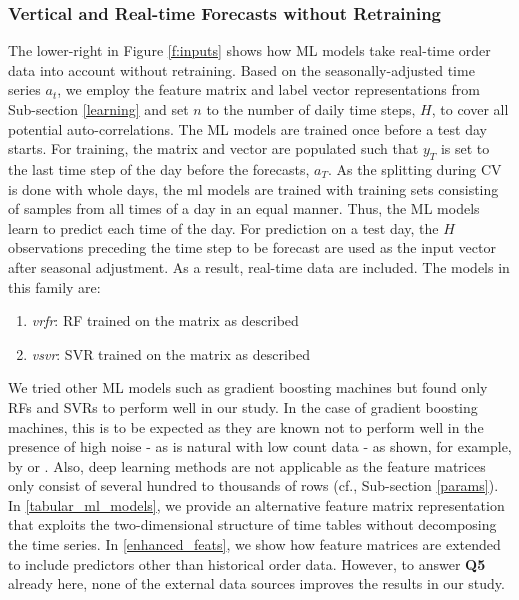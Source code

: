 \subsubsection{Vertical and Real-time Forecasts without Retraining}
\label{ml_models}

The lower-right in Figure \ref{f:inputs} shows how ML models take
    real-time order data into account without retraining.
Based on the seasonally-adjusted time series $a_t$, we employ the feature
    matrix and label vector representations from Sub-section \ref{learning}
    and set $n$ to the number of daily time steps, $H$, to cover all potential
    auto-correlations.
The ML models are trained once before a test day starts.
For training, the matrix and vector are populated such that $y_T$ is set to
    the last time step of the day before the forecasts, $a_T$.
As the splitting during CV is done with whole days, the \gls{ml} models are
    trained with training sets consisting of samples from all times of a day
    in an equal manner.
Thus, the ML models learn to predict each time of the day.
For prediction on a test day, the $H$ observations preceding the time
    step to be forecast are used as the input vector after seasonal
    adjustment.
As a result, real-time data are included.
The models in this family are:
\begin{enumerate}
\item \textit{\gls{vrfr}}: RF trained on the matrix as described
\item \textit{\gls{vsvr}}: SVR trained on the matrix as described
\end{enumerate}
We tried other ML models such as gradient boosting machines but found
    only RFs and SVRs to perform well in our study.
In the case of gradient boosting machines, this is to be expected as they are
    known not to perform well in the presence of high noise - as is natural
    with low count data - as shown, for example, by \cite{ma2018} or
    \cite{mason2000}.
Also, deep learning methods are not applicable as the feature matrices only
    consist of several hundred to thousands of rows (cf., Sub-section
    \ref{params}).
In \ref{tabular_ml_models}, we provide an alternative feature matrix
    representation that exploits the two-dimensional structure of time tables
    without decomposing the time series.
In \ref{enhanced_feats}, we show how feature matrices are extended
    to include predictors other than historical order data.
However, to answer \textbf{Q5} already here, none of the external data sources
    improves the results in our study.
